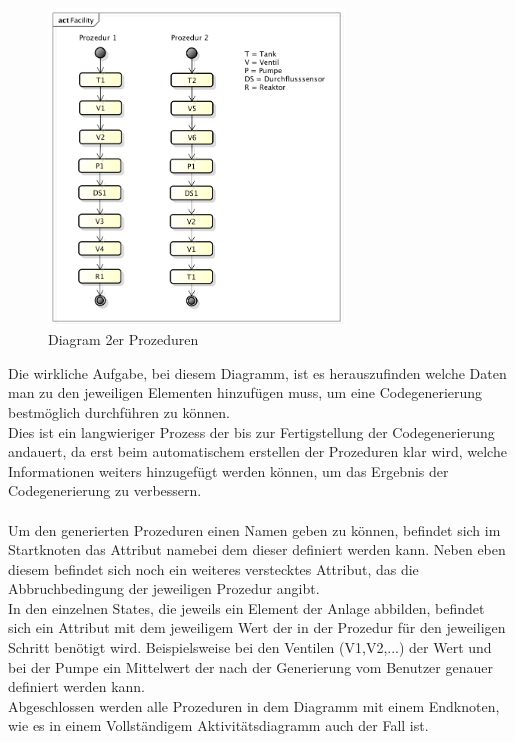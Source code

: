 \begin{figure}[hbt!]
  \centering
  \includegraphics[width=0.7\textwidth]{graphics/konzept/UML_Activity}
  \caption{Diagram 2er Prozeduren}
\end{figure}
Die wirkliche Aufgabe, bei diesem Diagramm, ist es herauszufinden welche Daten man zu den jeweiligen Elementen hinzufügen muss, um eine Codegenerierung bestmöglich durchführen zu können.\\
Dies ist ein langwieriger Prozess der bis zur Fertigstellung der Codegenerierung andauert, da erst beim automatischem erstellen der Prozeduren klar wird, welche Informationen weiters hinzugefügt werden können, um das Ergebnis der Codegenerierung zu verbessern.\\
\\
Um den generierten Prozeduren einen Namen geben zu können, befindet sich im Startknoten das Attribut \glqq name\grqq\space bei dem dieser definiert werden kann. Neben eben diesem befindet sich noch ein weiteres \glqq verstecktes Attribut\grqq\space , das die Abbruchbedingung der jeweiligen Prozedur angibt.\\
In den einzelnen States, die jeweils ein Element der Anlage abbilden, befindet sich ein Attribut mit dem jeweiligem Wert der in der Prozedur für den jeweiligen Schritt benötigt wird. Beispielsweise bei den Ventilen (V1,V2,...) der Wert \grqq\space und bei der Pumpe ein Mittelwert der nach der Generierung vom Benutzer genauer definiert werden kann.\\
Abgeschlossen werden alle Prozeduren in dem Diagramm mit einem Endknoten, wie es in einem Vollständigem Aktivitätsdiagramm auch der Fall ist.\\

